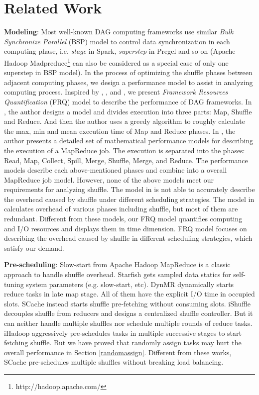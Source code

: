 \section{Related Work}

{\color{blue}
\textbf{Modeling}: Most well-known DAG computing frameworks use similar \textit{Bulk Synchronize Parallel} (BSP)\cite{valiant1990bridging} model to control data synchronization in each computing phase, i.e. \textit{stage} in Spark, \textit{superstep} in Pregel\cite{malewicz2010pregel} and so on (Apache Hadoop Madpreduce\footnote{http://hadoop.apache.com/} can also be considered as a special case of only one superstep in BSP model). 
In the process of optimizing the shuffle phases between adjacent computing phases, we design a performance model to assist in analyzing computing process.
Inspired by \cite{verma2011aria}, \cite{herodotou2011hadoop}, and \cite{polo2010performance}, we present \textit{Framework Resources Quantification} (FRQ) model to describe the performance of DAG frameworks.
In \cite{verma2011aria}, the author designs a model and divides execution into three parts: Map, Shuffle and Reduce. And then the author uses a greedy algorithm to roughly calculate the max, min and mean execution time of Map and Reduce phases.
In \cite{herodotou2011hadoop}, the author presents a detailed set of mathematical performance models for describing the execution of a MapReduce job. The execution is separated into the phases: Read, Map, Collect, Spill, Merge, Shuffle, Merge, and Reduce. The performance models describe each above-mentioned phases and combine into a overall MapReduce job model. 
However, none of the above models meet our requirements for analyzing shuffle.
The model in \cite{verma2011aria} is not able to accurately describe the overhead caused by shuffle under different scheduling strategies. The model in \cite{herodotou2011hadoop} calculates overhead of various phases including shuffle, but most of them are redundant. 
Different from these models, our FRQ model quantifies computing and I/O resources and displays them in time dimension. FRQ model focuses on describing the overhead caused by shuffle in different scheduling strategies, which satisfy our demand.
}

\textbf{Pre-scheduling}: Slow-start from Apache Hadoop MapReduce is a classic approach to handle shuffle overhead. 
Starfish \cite{starfish} gets sampled data statics for self-tuning system parameters (e.g. slow-start, etc). 
DynMR \cite{dynmr} dynamically starts reduce tasks in late map stage. 
All of them have the explicit I/O time in occupied slots. 
SCache instead starts shuffle pre-fetching without consuming slots. 
iShuffle \cite{ishuffle} decouples shuffle from reducers and designs a centralized shuffle controller. 
But it can neither handle multiple shuffles nor schedule multiple rounds of reduce tasks. 
iHadoop \cite{ihadoop} aggressively pre-schedules tasks in multiple successive stages to start fetching shuffle. 
But we have proved that randomly assign tasks may hurt the overall performance in Section \ref{randomassign}. 
Different from these works, SCache pre-schedules multiple shuffles without breaking load balancing. 

